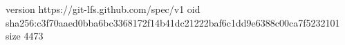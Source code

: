 version https://git-lfs.github.com/spec/v1
oid sha256:c3f70aaed0bba6bc3368172f14b41dc21222baf6c1dd9e6388c00ca7f5232101
size 4473
